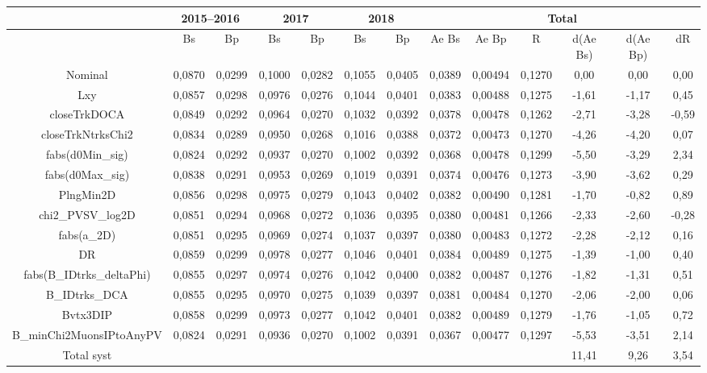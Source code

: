 \begin{table}

    \begin{tabular}{|c|c c|c c|c c|c|c|c|c|c|c|}
    \hline
     & \multicolumn{2}{|c|}{\textbf{2015--2016}} & \multicolumn{2}{|c|}{\textbf{2017}} & \multicolumn{2}{|c|}{\textbf{2018}} & \multicolumn{6}{|c|}{\textbf{Total}} \\
     \hline
    ~ & Bs & Bp  & Bs & Bp  & Bs & Bp  & Ae Bs & Ae Bp & R & d(Ae Bs) & d(Ae Bp) & dR  \\ \hline
    Nominal & 0,0870 & 0,0299  & 0,1000 & 0,0282  & 0,1055 & 0,0405  & 0,0389 & 0,00494 & 0,1270 & 0,00 & 0,00 & 0,00  \\ \hline
        Lxy & 0,0857 & 0,0298  & 0,0976 & 0,0276  & 0,1044 & 0,0401  & 0,0383 & 0,00488 & 0,1275 & -1,61 & -1,17 & 0,45  \\ \hline
        closeTrkDOCA & 0,0849 & 0,0292  & 0,0964 & 0,0270  & 0,1032 & 0,0392  & 0,0378 & 0,00478 & 0,1262 & -2,71 & -3,28 & -0,59  \\ \hline
        closeTrkNtrksChi2 & 0,0834 & 0,0289  & 0,0950 & 0,0268  & 0,1016 & 0,0388  & 0,0372 & 0,00473 & 0,1270 & -4,26 & -4,20 & 0,07  \\ \hline
        fabs(d0Min\_sig) & 0,0824 & 0,0292  & 0,0937 & 0,0270  & 0,1002 & 0,0392  & 0,0368 & 0,00478 & 0,1299 & -5,50 & -3,29 & 2,34  \\ \hline
        fabs(d0Max\_sig) & 0,0838 & 0,0291  & 0,0953 & 0,0269  & 0,1019 & 0,0391  & 0,0374 & 0,00476 & 0,1273 & -3,90 & -3,62 & 0,29  \\ \hline
        PlngMin2D & 0,0856 & 0,0298  & 0,0975 & 0,0279  & 0,1043 & 0,0402  & 0,0382 & 0,00490 & 0,1281 & -1,70 & -0,82 & 0,89  \\ \hline
        chi2\_PVSV\_log2D & 0,0851 & 0,0294  & 0,0968 & 0,0272  & 0,1036 & 0,0395  & 0,0380 & 0,00481 & 0,1266 & -2,33 & -2,60 & -0,28  \\ \hline
        fabs(a\_2D) & 0,0851 & 0,0295  & 0,0969 & 0,0274  & 0,1037 & 0,0397  & 0,0380 & 0,00483 & 0,1272 & -2,28 & -2,12 & 0,16  \\ \hline
        DR & 0,0859 & 0,0299  & 0,0978 & 0,0277  & 0,1046 & 0,0401  & 0,0384 & 0,00489 & 0,1275 & -1,39 & -1,00 & 0,40  \\ \hline
        fabs(B\_IDtrks\_deltaPhi) & 0,0855 & 0,0297  & 0,0974 & 0,0276  & 0,1042 & 0,0400  & 0,0382 & 0,00487 & 0,1276 & -1,82 & -1,31 & 0,51  \\ \hline
        B\_IDtrks\_DCA & 0,0855 & 0,0295  & 0,0970 & 0,0275  & 0,1039 & 0,0397  & 0,0381 & 0,00484 & 0,1270 & -2,06 & -2,00 & 0,06  \\ \hline
        Bvtx3DIP & 0,0858 & 0,0299  & 0,0973 & 0,0277  & 0,1042 & 0,0401  & 0,0382 & 0,00489 & 0,1279 & -1,76 & -1,05 & 0,72  \\ \hline
        B\_minChi2MuonsIPtoAnyPV & 0,0824 & 0,0291  & 0,0936 & 0,0270  & 0,1002 & 0,0391  & 0,0367 & 0,00477 & 0,1297 & -5,53 & -3,51 & 2,14  \\ \hline
        Total syst & ~ &   & ~ &   & ~ &   & ~ & ~ & ~ & 11,41 & 9,26 & 3,54  \\ \hline


\end{tabular}
\end{table}
